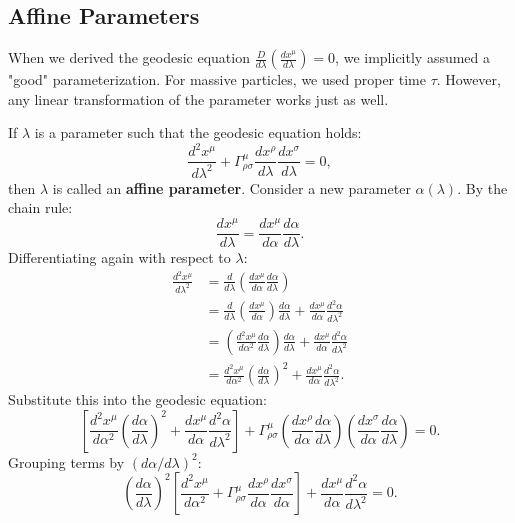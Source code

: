 \documentclass[11pt, a4paper]{report}
\begin{document}
\subsection*{Affine Parameters}
When we derived the geodesic equation \(\frac{D}{d\lambda} (\frac{dx^\mu}{d\lambda}) = 0\), we implicitly assumed a "good" parameterization. For massive particles, we used proper time \(\tau\). However, any linear transformation of the parameter works just as well.

If \(\lambda\) is a parameter such that the geodesic equation holds:
\begin{equation}
\frac{d^2 x^\mu}{d\lambda^2} + \Gamma^\mu_{\rho\sigma} \frac{dx^\rho}{d\lambda} \frac{dx^\sigma}{d\lambda} = 0,
\end{equation}
then \(\lambda\) is called an \textbf{affine parameter}.
Consider a new parameter \(\alpha(\lambda)\). By the chain rule:
\begin{equation}
\frac{dx^\mu}{d\lambda} = \frac{dx^\mu}{d\alpha} \frac{d\alpha}{d\lambda}.
\end{equation}
Differentiating again with respect to \(\lambda\):
\begin{align}
\frac{d^2 x^\mu}{d\lambda^2} &= \frac{d}{d\lambda} \left( \frac{dx^\mu}{d\alpha} \frac{d\alpha}{d\lambda} \right) \\
&= \frac{d}{d\lambda} \left( \frac{dx^\mu}{d\alpha} \right) \frac{d\alpha}{d\lambda} + \frac{dx^\mu}{d\alpha} \frac{d^2\alpha}{d\lambda^2} \\
&= \left( \frac{d^2 x^\mu}{d\alpha^2} \frac{d\alpha}{d\lambda} \right) \frac{d\alpha}{d\lambda} + \frac{dx^\mu}{d\alpha} \frac{d^2\alpha}{d\lambda^2} \\
&= \frac{d^2 x^\mu}{d\alpha^2} \left( \frac{d\alpha}{d\lambda} \right)^2 + \frac{dx^\mu}{d\alpha} \frac{d^2\alpha}{d\lambda^2}.
\end{align}
Substitute this into the geodesic equation:
\begin{equation}
\left[ \frac{d^2 x^\mu}{d\alpha^2} \left( \frac{d\alpha}{d\lambda} \right)^2 + \frac{dx^\mu}{d\alpha} \frac{d^2\alpha}{d\lambda^2} \right] + \Gamma^\mu_{\rho\sigma} \left( \frac{dx^\rho}{d\alpha} \frac{d\alpha}{d\lambda} \right) \left( \frac{dx^\sigma}{d\alpha} \frac{d\alpha}{d\lambda} \right) = 0.
\end{equation}
Grouping terms by \((d\alpha/d\lambda)^2\):
\begin{equation}
\left( \frac{d\alpha}{d\lambda} \right)^2 \left[ \frac{d^2 x^\mu}{d\alpha^2} + \Gamma^\mu_{\rho\sigma} \frac{dx^\rho}{d\alpha} \frac{dx^\sigma}{d\alpha} \right] + \frac{dx^\mu}{d\alpha} \frac{d^2\alpha}{d\lambda^2} = 0.
\end{equation}
\end{document}

